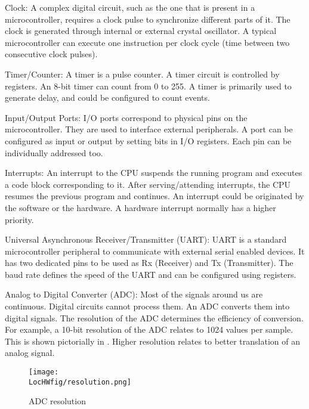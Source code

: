 \begin{description}
\item {Clock:} A complex digital circuit, such as the one that is
  present in a microcontroller, requires a clock pulse to
  synchronize different parts of it.  The clock
  is generated through internal or external crystal oscillator. A
  typical microcontroller can execute one instruction per clock
  cycle (time between two consecutive clock pulses).

\item {Timer/Counter:} A timer is a pulse counter. A timer circuit is
  controlled by registers. An 8-bit timer can count from 0 to 255. A
  timer is primarily used to generate delay, and could be configured
  to count events.
    
\item{Input/Output Ports:} I/O ports correspond to physical pins on
  the microcontroller. They are used to interface external peripherals. A
  port can be configured as input or output by setting bits in I/O
  registers. Each pin can be individually addressed too.

\item{Interrupts:} An interrupt to the CPU suspends the running program
  and executes a code block corresponding to it. After serving/attending
  interrupts, the CPU resumes the previous program and continues. An
  interrupt could be originated by the software or the hardware. A
  hardware interrupt normally has a higher priority.

\item {Universal Asynchronous Receiver/Transmitter (UART):} UART is a
  standard microcontroller peripheral to communicate with external
  serial enabled devices. It has two dedicated pins to be used as
  Rx (Receiver) and Tx (Transmitter).  The baud rate defines the speed
  of the UART and can be configured using registers.

\item {Analog to Digital Converter (ADC):} Most of the signals around
  us are continuous. Digital circuits cannot process them. An ADC
  converts them into digital signals. The resolution of the ADC
  determines the efficiency of conversion. For example, a 10-bit
  resolution of the ADC relates to 1024 values per sample. This is
  shown pictorially in . Higher resolution relates
  to better translation of an analog signal.

\begin{figure}
  \centering
  \texttt{[image: \\LocHWfig/resolution.png]}
  \caption{ADC resolution}
  \label{resolution}
\end{figure}


\end{description}
